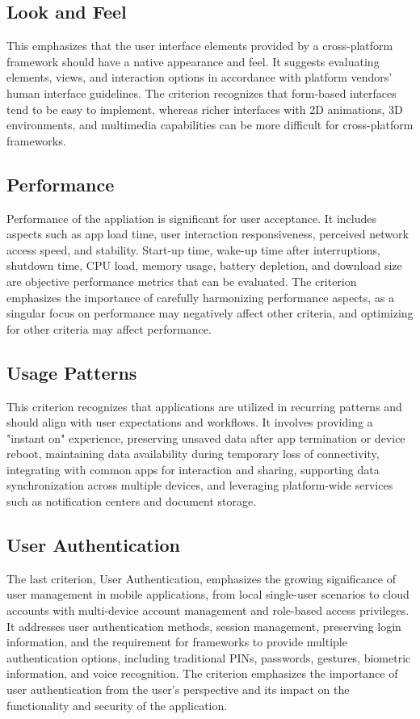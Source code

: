 \subsection{Look and Feel}
This emphasizes that the user interface elements provided by a cross-platform framework should have a native appearance and feel. It suggests evaluating elements, views, and interaction options in accordance with platform vendors' human interface guidelines. The criterion recognizes that form-based interfaces tend to be easy to implement, whereas richer interfaces with 2D animations, 3D environments, and multimedia capabilities can be more difficult for cross-platform frameworks.

\subsection{Performance}
Performance of the appliation is significant for user acceptance. It includes aspects such as app load time, user interaction responsiveness, perceived network access speed, and stability. Start-up time, wake-up time after interruptions, shutdown time, CPU load, memory usage, battery depletion, and download size are objective performance metrics that can be evaluated. The criterion emphasizes the importance of carefully harmonizing performance aspects, as a singular focus on performance may negatively affect other criteria, and optimizing for other criteria may affect performance.

\subsection{Usage Patterns}
This criterion recognizes that applications are utilized in recurring patterns and should align with user expectations and workflows. It involves providing a "instant on" experience, preserving unsaved data after app termination or device reboot, maintaining data availability during temporary loss of connectivity, integrating with common apps for interaction and sharing, supporting data synchronization across multiple devices, and leveraging platform-wide services such as notification centers and document storage.

\subsection{User Authentication}
The last criterion, User Authentication, emphasizes the growing significance of user management in mobile applications, from local single-user scenarios to cloud accounts with multi-device account management and role-based access privileges. It addresses user authentication methods, session management, preserving login information, and the requirement for frameworks to provide multiple authentication options, including traditional PINs, passwords, gestures, biometric information, and voice recognition. The criterion emphasizes the importance of user authentication from the user's perspective and its impact on the functionality and security of the application.

